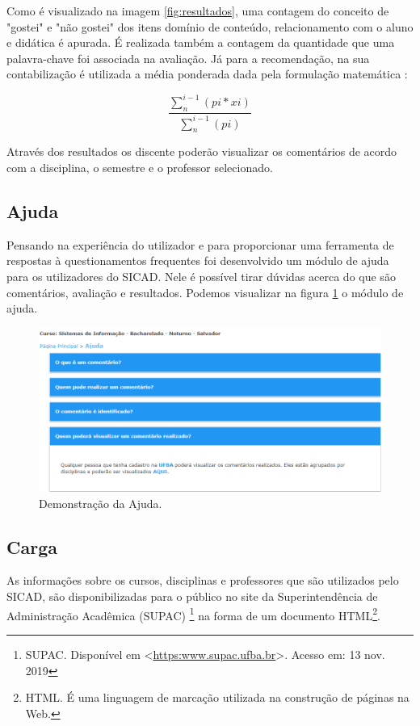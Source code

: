 \documentclass[12pt, a4paper]{report}
\begin{document}
Como é visualizado na imagem \ref{fig:resultados}, uma contagem do conceito de "gostei" e "não gostei" dos itens domínio de conteúdo, relacionamento com o aluno e didática é apurada. É realizada também a contagem da quantidade que uma palavra-chave foi associada na avaliação. Já para a recomendação, na sua contabilização é utilizada a média ponderada dada pela formulação matemática :

\begin{equation}
\frac{\sum_{n}^{i-1}(pi*xi)}{\sum_{n}^{i-1}(pi)} 
\end{equation}

Através dos resultados os discente poderão visualizar os comentários de acordo com a disciplina, o semestre e o professor selecionado.

\subsection{Ajuda}

Pensando na experiência do utilizador e para proporcionar uma ferramenta de respostas à questionamentos frequentes foi desenvolvido um módulo de ajuda para os utilizadores do SICAD. Nele é possível tirar dúvidas acerca do que são comentários, avaliação e resultados. Podemos visualizar na figura \ref{fig:ajuda} o módulo de ajuda.

\begin{figure}
\centering
\includegraphics[scale=0.6]{ajuda.png}
\caption{Demonstração da Ajuda.}
\label{fig:ajuda}
\end{figure}

\subsection{Carga}
As informações sobre os cursos, disciplinas e professores que são utilizados pelo SICAD, são disponibilizadas para o público no site da Superintendência de Administração Acadêmica (SUPAC) \footnote{SUPAC. Disponível em <\url{https:www.supac.ufba.br}>. Acesso em: 13 nov. 2019} na forma de um documento HTML\footnote{HTML. É  uma linguagem de marcação utilizada na construção de páginas na Web.}.
\end{document}
